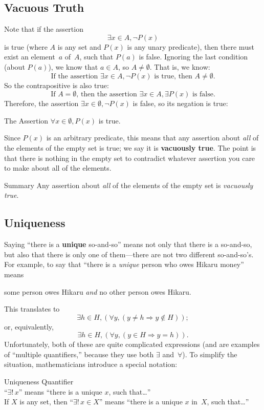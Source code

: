 \documentclass[../MATH-2000-Notes.tex]{subfiles}
\begin{document}
\subsection{Vacuous Truth}
Note that if the assertion
	$$ \exists x \in A, \neg P(x)$$
is true (where $A$ is any set and $P(x)$ is  any unary predicate), then there must exist an element~$a$ of~$A$, such that $P(a)$ is false. Ignoring the last condition (about $P(a)$), we know that $a \in A$, so $A \neq \emptyset$. That is, we know:
	$$ \text{If the assertion \ $\exists x \in A, \neg P(x)$ \  is true, then $A \neq \emptyset$.} $$
So the contrapositive is also true:
	$$ \text{If $A = \emptyset$, then the assertion \ $\exists x \in A, \exists P(x)$ \ is false.} $$
Therefore, the assertion $\exists x \in \emptyset, \neg P(x)$ is false, so its negation is true:
\begin{paperbox}{The Assertion}
    $\forall x \in \emptyset, P(x)$ is true.
\end{paperbox}
Since $P(x)$ is an arbitrary predicate, this means that any assertion about \emph{all} of the elements of the empty set is true; we say it is \textbf{vacuously true}.
The point is that there is nothing in the empty set to contradict whatever assertion you care to make about all of the elements.
\begin{paperbox}{Summary}
    Any assertion about \emph{all} of the elements of the empty set is \emph{vacuously true}.
\end{paperbox}
\subsection{Uniqueness}
Saying ``there is a \textbf{unique} so-and-so'' means not only that there is a so-and-so, but also that there is only one of them---there are not two different so-and-so's. For example, to say that
``there is a \emph{unique} person who owes Hikaru money'' means
\begin{quotebox}
    some person owes Hikaru 
    \emph{and} no other person owes Hikaru.
\end{quotebox}
This translates to
    $$ \exists h\in H, \left( \forall y, (y \neq h \Rightarrow y \notin H) \right);$$
or, equivalently,
    $$ \exists h\in H, \left( \forall y, ( y \in H \Rightarrow y =h ) \right).$$ 
Unfortunately, both of these are quite complicated expressions (and are examples of ``multiple quantifiers\rlap,'' because they use both $\exists$ and~$\forall$). To simplify the situation, mathematicians introduce a special notation: 
\begin{Definition}
    {Uniqueness Quantifier}~\\
    ``$\exists!\, x$'' means ``there is a unique $x$, such that\dots''\\%
    If $X$ is any set, then ``$\exists!\, x \in X$'' means ``there is a unique $x$ in~$X$, such that\dots''
\end{Definition}
\end{document}
